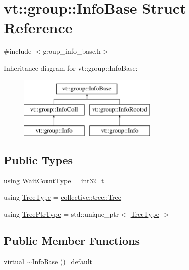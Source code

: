 \hypertarget{structvt_1_1group_1_1_info_base}{}\section{vt\+:\+:group\+:\+:Info\+Base Struct Reference}
\label{structvt_1_1group_1_1_info_base}


{\ttfamily \#include $<$group\+\_\+info\+\_\+base.\+h$>$}

Inheritance diagram for vt\+:\+:group\+:\+:Info\+Base\+:\begin{figure}[H]
\begin{center}
\leavevmode
\includegraphics[height=3.000000cm]{structvt_1_1group_1_1_info_base}
\end{center}
\end{figure}
\subsection*{Public Types}
\begin{DoxyCompactItemize}
\item 
using \hyperlink{structvt_1_1group_1_1_info_base_a0924de8df3a2ec72ebdd499ad8a28abf}{Wait\+Count\+Type} = int32\+\_\+t
\item 
using \hyperlink{structvt_1_1group_1_1_info_base_a96e01b6097ed7b2bc299027d0a7a1b1e}{Tree\+Type} = \hyperlink{structvt_1_1collective_1_1tree_1_1_tree}{collective\+::tree\+::\+Tree}
\item 
using \hyperlink{structvt_1_1group_1_1_info_base_af1111ac71e1ee7a009f00ebece27c3a3}{Tree\+Ptr\+Type} = std\+::unique\+\_\+ptr$<$ \hyperlink{structvt_1_1group_1_1_info_base_a96e01b6097ed7b2bc299027d0a7a1b1e}{Tree\+Type} $>$
\end{DoxyCompactItemize}
\subsection*{Public Member Functions}
\begin{DoxyCompactItemize}
\item 
virtual \hyperlink{structvt_1_1group_1_1_info_base_af00f9a2776ad9eb9da136e4c1abc5d0d}{$\sim$\+Info\+Base} ()=default
\end{DoxyCompactItemize}
